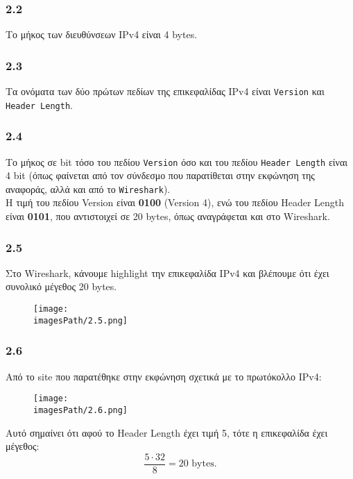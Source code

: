 		\subsubsection*{2.2}
			Το μήκος των διευθύνσεων IPv4 είναι 4 bytes.
		
		\subsubsection*{2.3}
			Τα ονόματα των δύο πρώτων πεδίων της επικεφαλίδας IPv4 είναι \verb|Version| και \verb|Header Length|.
		
		\subsubsection*{2.4}
			Το μήκος σε bit τόσο του πεδίου \verb|Version| όσο και του πεδίου \verb|Header Length| είναι 4 bit (όπως φαίνεται από τον σύνδεσμο που παρατίθεται στην εκφώνηση της αναφοράς, αλλά και από το \verb|Wireshark|). \\
			Η τιμή του πεδίου Version είναι \textbf{0100} (Version 4), ενώ του πεδίου Header Length είναι \textbf{0101}, που αντιστοιχεί σε 20 bytes, όπως αναγράφεται και στο Wireshark.
		
		\subsubsection*{2.5}
		
			Στο Wireshark, κάνουμε highlight την επικεφαλίδα IPv4 και βλέπουμε ότι έχει συνολικό μέγεθος 20 bytes.
			
			\begin{figure}[H]
				\texttt{[image: \\imagesPath/2.5.png]}
			\end{figure}
		
		\subsubsection*{2.6}
			
			Από το site που παρατέθηκε στην εκφώνηση σχετικά με το πρωτόκολλο IPv4:
			
			\begin{figure}[H]
				\texttt{[image: \\imagesPath/2.6.png]}
			\end{figure}
		
			Αυτό σημαίνει ότι αφού το Header Length έχει τιμή 5, τότε η επικεφαλίδα έχει μέγεθος: 
				\[
					\dfrac{5 \cdot 32}{8} = 20 \text{ bytes.}
				\]
				
